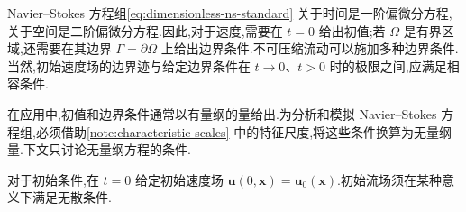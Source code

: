 \begin{note}[一般考虑]\label{note:initial-boundary-general}
Navier--Stokes 方程组\cref{eq:dimensionless-ns-standard} 关于时间是一阶偏微分方程,关于空间是二阶偏微分方程.因此,对于速度,需要在 $t=0$ 给出初值;若 $\Omega$ 是有界区域,还需要在其边界 $\Gamma=\partial\Omega$ 上给出边界条件.不可压缩流动可以施加多种边界条件.当然,初始速度场的边界迹与给定边界条件在 $t\to0$、$t>0$ 时的极限之间,应满足相容条件.

在应用中,初值和边界条件通常以有量纲的量给出.为分析和模拟 Navier--Stokes 方程组,必须借助\cref{note:characteristic-scales} 中的特征尺度,将这些条件换算为无量纲量.下文只讨论无量纲方程的条件.
\end{note}

\begin{note}[初始条件]\label{note:initial-condition}
对于初始条件,在 $t=0$ 给定初始速度场 $\bm{u}(0,\bm{x})=\bm{u}_0(\bm{x})$.初始流场须在某种意义下满足无散条件.
\end{note}


